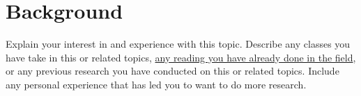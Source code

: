 
\section[Background]{Background}

Explain your interest in and experience with this topic. Describe any classes you have take in this or related topics, \underline{any reading you have already done in the field}, or any previous research you have conducted on this or related topics. Include any personal experience that has led you to want to do more research.